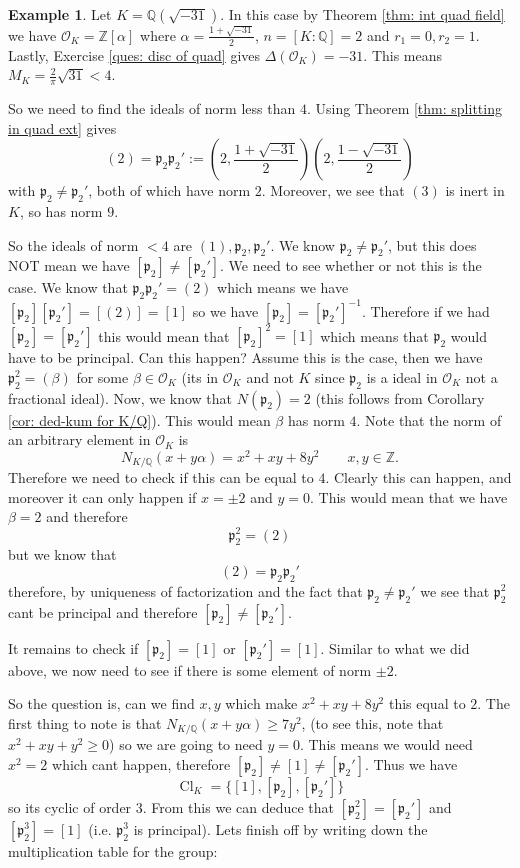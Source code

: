 \documentclass[11pt,a4paper]{report}
\theoremstyle{plain}
\theoremstyle{definition}
\newtheorem{exmp}[subsection]{Example}
\theoremstyle{definition}
\newcommand{\ZZ}{\mathbb{Z}}
\def\QQ{\mathbb{Q}}
\def\gothp{\mathfrak{p}}
\def \a{\alpha}
\def \OO {\mathcal{O}}
\DeclareMathOperator{\Cl}{Cl}
\begin{document}
	\begin{exmp}
		Let $K=\QQ(\sqrt{-31})$. In this case by Theorem \ref{thm: int quad field} we have $\OO_K=\ZZ[\a]$ where $\a=\frac{1+\sqrt{-31}}{2}$, $n=[K:\QQ]=2$ and $r_1=0,r_2=1$. Lastly, Exercise \ref{ques: disc of quad} gives $\Delta(\OO_K)=-31$. This means $M_K=\frac{2}{\pi}\sqrt{31} < 4$.
		
		So we need to find the ideals of norm less than $4$. Using Theorem \ref{thm: splitting in quad ext} gives \[(2)=\gothp_2\gothp_2':=(2,\frac{1+\sqrt{-31}}{2})(2,\frac{1-\sqrt{-31}}{2})\] with $\gothp_2 \neq \gothp_2'$, both of which have norm $2$. Moreover, we see that $(3)$ is inert in $K$, so has norm $9$.
		
		So the ideals of norm $<4$ are $(1),\gothp_2,\gothp_{2}'$. We know $\gothp_2 \neq \gothp_2'$, but this does NOT mean we have $[\gothp_2] \neq [\gothp_2']$. We need to see whether or not this is the case. We know that $\gothp_2\gothp_2'=(2)$ which means we have $[\gothp_2][\gothp_2']=[(2)]=[1]$ so we have $[\gothp_2]=[\gothp_2']^{-1}$. Therefore if we had $[\gothp_2] = [\gothp_2']$ this would mean that $[\gothp_2]^2=[1]$ which means that $\gothp_2$ would have to be principal. Can this happen? Assume this is the case, then we have $\gothp_2^2=(\beta)$ for some $\beta \in \OO_K$ (its in $\OO_K$ and not $K$ since $\gothp_2$ is a ideal in $\OO_K$ not a fractional ideal). Now, we know that $N(\gothp_2)=2$ (this follows from Corollary \ref{cor: ded-kum for K/Q}). This would mean $\beta$ has norm $4$. Note that the norm of an arbitrary element in $\OO_K$ is  \[N_{K/\QQ}(x+y \a)=x^2+xy+8y^2 \qquad x,y \in \ZZ.\] Therefore we need to check if this can be equal to $4$. Clearly this can happen, and moreover it can only happen if $x=\pm 2$ and $y=0$. This would mean that we have $\beta=2$ and therefore \[\gothp_2^2=(2)\] but we know that \[(2)=\gothp_2\gothp_2'\] therefore, by uniqueness of factorization and the fact that $\gothp_2 \neq \gothp_2'$ we see that $\gothp_2^2$ cant be principal and therefore $[\gothp_2] \neq [\gothp_2']$.
		
		
		
		It remains to check if $[\gothp_2]=[1]$ or $[\gothp_2']=[1]$. Similar to what we did above, we now need to see if there is some element of norm $\pm 2$.
		
		So the question is, can we find $x,y$ which make $x^2+xy+8y^2$ this equal to $2$. The first thing to note is that $N_{K/\QQ}(x+y\a) \geq 7y^2$, (to see this, note that $x^2+xy+y^2 \geq 0$) so we are going to need $y=0$. This means we would need $x^2=2$ which cant happen, therefore $[\gothp_2] \neq [1] \neq [\gothp_2']$. Thus we have \[\Cl_K=\{[1],[\gothp_2],[\gothp_2']\}\] so its cyclic of order $3$. From this we can deduce that $[\gothp_2^2]=[\gothp_2']$ and $[\gothp_2^3]=[1]$ (i.e. $\gothp_2^3$ is principal). Lets finish off by writing down the multiplication table for the group:
		

\end{exmp}
\end{document}
